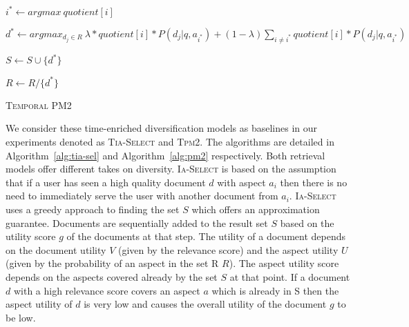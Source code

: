 \begin{algorithm}[t]
  \small


  \nl{}
    
  \nl $i^{*} \leftarrow argmax \: quotient[i]$

  \nl $d^{*} \leftarrow argmax_{d_j \in R} \: \lambda * quotient[i] * P(d_j|q,a_{i^{*}})+ (1-\lambda)\sum_{i \neq i^{*}} quotient[i] * P(d_j|q,a_{i^{*}})$

  \nl $S \leftarrow S \cup \{d^{*}\}$
  
  \nl $R \leftarrow R / \{d^{*}\}$
  
  \nl{}


  \nl{}

  \BlankLine

  \caption{\textsc{Temporal PM2}}
  \vspace{-2mm}
  \label{alg:pm2}
\end{algorithm}


We consider these time-enriched diversification models as baselines in our experiments denoted as \textsc{Tia-Select} and \textsc{Tpm2}. The algorithms are detailed in Algorithm~\ref{alg:tia-sel} and Algorithm~\ref{alg:pm2} respectively. Both retrieval models offer different takes on diversity. \textsc{Ia-Select} is based on the assumption that if a user has seen a high quality document $d$ with aspect $a_i$ then there is no need to immediately serve the user with another document from $a_i$. \textsc{Ia-Select} uses a greedy approach to finding the set $S$ which offers an approximation guarantee. Documents are sequentially added to the result set $S$ based on the utility score $g$ of the documents at that step. The utility of a document depends on the document utility $V$ (given by the relevance score) and the aspect utility $U$ (given by the probability of an aspect in the set R $R$). The aspect utility score depends on the aspects covered already by the set $S$ at that point. If a document $d$ with a high relevance score covers an aspect $a$ which is already in S then the aspect utility of $d$ is very low and causes the overall utility of the document $g$ to be low.

